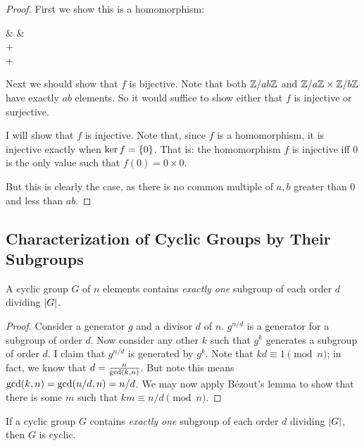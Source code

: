 \begin{proof}
  First we show this is a homomorphism:

  \begin{nedqn}
  & \mapsto &
     \times {}
  \\
  \eqcol
     \times {}
    +
     \times {}
  \\
  \eqcol
     + 
  \end{nedqn}

  Next we should show that $f$ is bijective. Note that both $\mathbb{Z} / ab\mathbb{Z}$
  and $\mathbb{Z} / a\mathbb{Z} \times \mathbb{Z} / b\mathbb{Z}$ have exactly $ab$ elements. So it would
  suffice to show either that $f$ is injective or surjective.

  I will show that $f$ is injective. Note that, since $f$ is a
  homomorphism, it is injective exactly when $\ker f = \left\{ 0 \right\}$. That
  is: the homomorphism $f$ is injective iff $0$ is the only value such
  that $f(0) = 0 \times 0$.

  But this is clearly the case, as there is no common multiple of $a, b$
  greater than $0$ and less than $ab$.
\end{proof}

\subsection{Characterization of Cyclic Groups by Their Subgroups}

\begin{proposition}
  A cyclic group $G$ of $n$ elements contains \emph{exactly one}
  subgroup of each order $d$ dividing $|G|$.
\end{proposition}

\begin{proof}
  Consider a generator $g$ and a divisor $d$ of $n$. $g^{n/d}$ is a
  generator for a subgroup of order $d$. Now consider any other $k$ such
  that $g^k$ generates a subgroup of order $d$. I claim that $g^{n/d}$
  is generated by $g^k$. Note that $kd \equiv 1 \pmod{n}$; in fact, we
  know that $d = \frac{n}{\gcd\mathopen{}\left( {k, n} \right)\mathclose{}}$. But note this means $\gcd\mathopen{}\left( {k,
  n} \right)\mathclose{} = \gcd\mathopen{}\left( {n/d, n} \right)\mathclose{} = n/d$. We may now apply Bézout's lemma to show
  that there is some $m$ such that $km \equiv n/d \pmod{n}$.
\end{proof}

\begin{proposition}
  If a cyclic group $G$ contains \emph{exactly one} subgroup of each
  order $d$ dividing $|G|$, then $G$ is cyclic.
\end{proposition}

